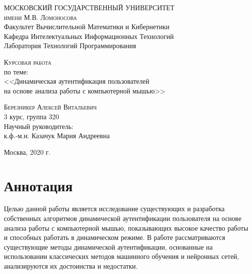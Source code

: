 \documentclass[12pt]{article}
\begin{document}
    \begin{titlepage}
        \begin{center}
            \textsc{
            \large
            МОСКОВСКИЙ ГОСУДАРСТВЕННЫЙ УНИВЕРСИТЕТ \\
            имени М.В. Ломоносова
            } \\
            [5mm]

            Факультет Вычислительной Математики и Кибернетики \\
            Кафедра Интелектуальных Информационных Технологий \\
            Лаборатория Технологий Программирования 
            \vfill
    
            \textsc{Курсовая работа} \\
            по теме: \\
            [5mm]
            {\LARGE
            <<Динамическая аутентификация пользователей \\
            на основе анализа работы с компьютерной мышью>>
            }
            \vfill
            \begin{flushright}
                \textsc{Березникер Алексей Витальевич} \\
                3 курс, группа 320 \\
                [5mm]
                Научный руководитель: \\
                к.ф.-м.н. Казачук Мария Андреевна \\
            \end{flushright}
            \vfill

            Москва, 2020 г.
        \end{center}
    \end{titlepage}



    \tableofcontents
    \newpage



    \section{Аннотация}
    \label{sec:Annotation}

    \par Целью данной работы является исследование существующих и разработка собственных алгоритмов динамической аутентификации пользователя на основе анализа работы с компьютерной мышью, показывающих высокое качество работы и способных работать в динамическом режиме. В работе рассматриваются существующие методы динамической аутентификации, основанные на использовании классических методов машинного обучения и нейронных сетей, анализируются их достоинства и недостатки. \\
\end{document}
